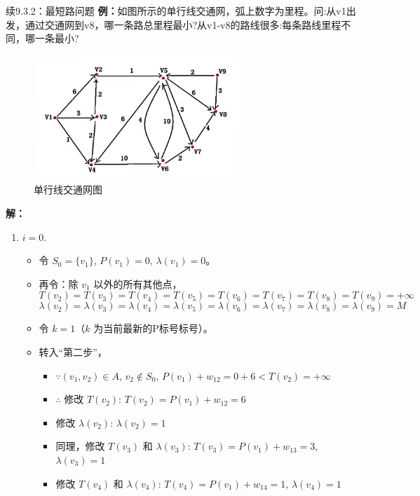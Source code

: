 	\begin{exbox}{续9.3.2：最短路问题}{}
		\textbf{例：}如图所示的单行线交通网，弧上数字为里程。问:从v1出发，通过交通网到v8，哪一条路总里程最小?从v1-v8的路线很多:每条路线里程不同，哪一条最小?
		\begin{figure}[H]
			\centering
			\includegraphics[width=0.7\textwidth]{./image/38.png}
			\caption{单行线交通网图}
			\label{fig:Chapter4_Temporary_Pavilion_1}
		\end{figure}
		\textbf{解：}
		\begin{enumerate}[label=(\arabic*)]
			\item \( i = 0 \).
			\begin{itemize}
				\item 令 \( S_0 = \{v_1\} \), \( P(v_1) = 0 \), \( \lambda(v_1) = 0 \)。
				\item 再令：除 \( v_1 \) 以外的所有其他点，
				\[
				T(v_2) = T(v_3) = T(v_4) = T(v_5) = T(v_6) = T(v_7) = T(v_8) = T(v_9) = +\infty
				\]
				\[
				\lambda(v_2) = \lambda(v_3) = \lambda(v_4) = \lambda(v_5) = \lambda(v_6) = \lambda(v_7) = \lambda(v_8) = \lambda(v_9) = M
				\]
				\item 令 \( k = 1 \)（\( k \) 为当前最新的P标号标号）。
				\item 转入“第二步”，
				\begin{itemize}
					\item \(\because (v_1, v_2) \in A\), \( v_2 \notin S_0 \), \( P(v_1) + w_{12} = 0 + 6 < T(v_2) = +\infty \)
					\item \(\therefore\) 修改 \( T(v_2) \): \( T(v_2) = P(v_1) + w_{12} = 6 \)
					\item 修改 \( \lambda(v_2) \): \( \lambda(v_2) = 1 \)
					\item 同理，修改 \( T(v_3) \) 和 \( \lambda(v_3) \): \( T(v_3) = P(v_1) + w_{13} = 3 \), \( \lambda(v_3) = 1 \)
					\item 修改 \( T(v_4) \) 和 \( \lambda(v_4) \): \( T(v_4) = P(v_1) + w_{14} = 1 \), \( \lambda(v_4) = 1 \)

\end{itemize}
\end{itemize}
\end{enumerate}
\end{exbox}
